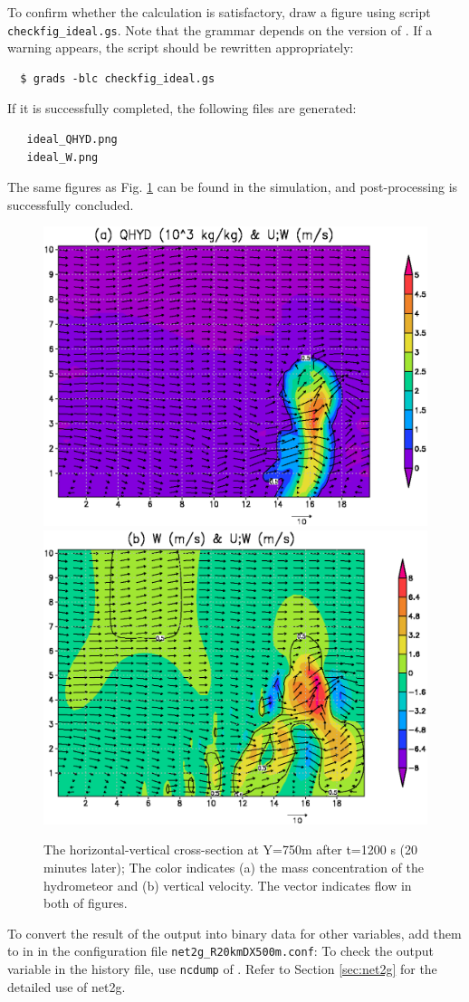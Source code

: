 To confirm whether the calculation is satisfactory,
draw a figure using \grads script \verb|checkfig_ideal.gs|.
Note that the grammar depends on the version of \grads.
If a warning appears, the \grads script should be rewritten appropriately:
\begin{verbatim}
  $ grads -blc checkfig_ideal.gs
\end{verbatim}
If it is successfully completed, the following files are generated:

\begin{verbatim}
   ideal_QHYD.png
   ideal_W.png
\end{verbatim}
The same figures as Fig. \ref{fig_ideal} can be found in the simulation,
and post-processing is successfully concluded.

\begin{figure}[htb]
\begin{center}
  \includegraphics[width=0.65\hsize]{./figure/ideal_qhyd.eps}\\
  \includegraphics[width=0.65\hsize]{./figure/ideal_W.eps}\\
  \caption{The horizontal-vertical cross-section at Y=750m after t=1200 s (20 minutes later);
            The color indicates (a) the mass concentration of the hydrometeor and (b) vertical velocity. The vector indicates flow in both of figures.}
  \label{fig_ideal}
\end{center}
\end{figure}

To convert the result of the output into binary data for other variables,
add them to  in  in the configuration file \verb|net2g_R20kmDX500m.conf|:
To check the output variable in the history file, use \verb|ncdump| of {\netcdf}.
Refer to Section \ref{sec:net2g} for the detailed use of net2g.

